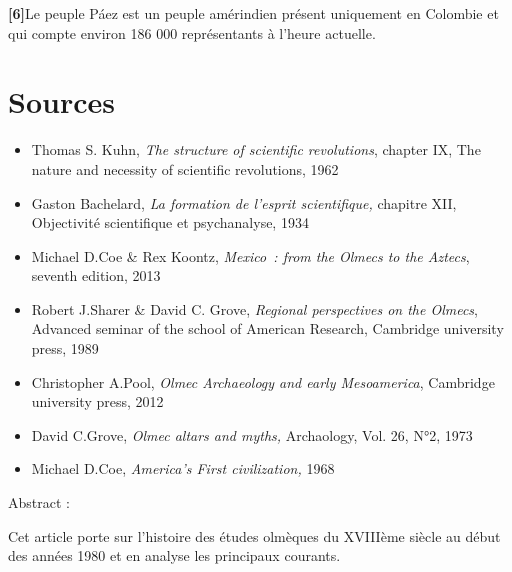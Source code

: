 \documentclass[11pt,a4paper]{article}
\begin{document}
\textbf{{[}6{]}}Le peuple Páez est un peuple amérindien présent uniquement en Colombie et qui compte environ 186 000 représentants à l'heure actuelle.

\section{Sources}
\small

\begin{itemize}[leftmargin=1.3em,itemsep=.18em,topsep=.25em]
\item
  Thomas S. Kuhn, \emph{The structure of scientific revolutions}, chapter IX, The nature and necessity of scientific revolutions, 1962
\item
  Gaston Bachelard, \emph{La formation de l'esprit scientifique,} chapitre XII, Objectivité scientifique et psychanalyse, 1934
\item
  Michael D.Coe \& Rex Koontz, \emph{Mexico~: from the Olmecs to the Aztecs}, seventh edition, 2013
\item
  Robert J.Sharer \& David C. Grove, \emph{Regional perspectives on the Olmecs}, Advanced seminar of the school of American Research, Cambridge university press, 1989
\item
  Christopher A.Pool, \emph{Olmec Archaeology and early Mesoamerica}, Cambridge university press, 2012
\item
  David C.Grove, \emph{Olmec altars and myths,} Archaology, Vol. 26, N°2, 1973
\item
  Michael D.Coe, \emph{America's First civilization,} 1968
\end{itemize}

Abstract :

Cet article porte sur l'histoire des études olmèques du XVIIIème siècle au début des années 1980 et en analyse les principaux courants.
\end{document}

